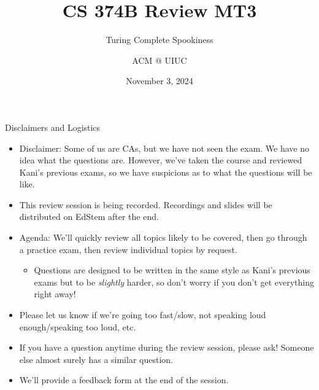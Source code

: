 \documentclass{beamer}
\title[ACM fun]{CS 374B Review MT3}
\subtitle{Turing Complete Spookiness}
\author{ACM @ UIUC}
\date{November 3, 2024}
\begin{document}
\begin{frame}
  \titlepage
\end{frame}

\begin{frame}[t]{Disclaimers and Logistics}
  \begin{itemize}
  \item \alert{Disclaimer:} Some of us are CAs, but we have not seen the exam. We have no idea what the questions are. However, we've taken the course and reviewed Kani's previous exams, so we have \alert{suspicions} as to what the questions will be like.
  \item This review session is being recorded. Recordings and slides will be distributed on EdStem after the end.
  \item \alert{Agenda:} We'll quickly review all topics likely to be covered, then go through a practice exam, then review individual topics by request.
  \begin{itemize}
      \item Questions are designed to be written in the same style as Kani's previous exams but to be \textit{slightly} harder, so don't worry if you don't get everything right away!
  \end{itemize}
  \item Please let us know if we're going too fast/slow, not speaking loud enough/speaking too loud, etc.
  \item If you have a question anytime during the review session, please ask! Someone else almost surely has a similar question.
  \item We'll provide a feedback form at the end of the session.
  \end{itemize}
\end{frame}
\end{document}
